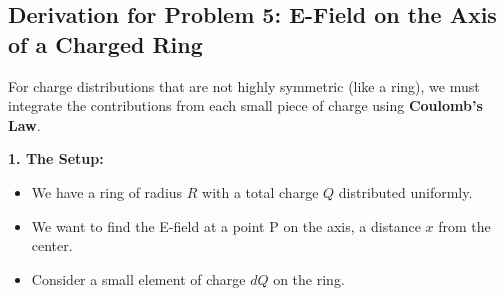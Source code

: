 \documentclass{article}
\numberwithin{equation}{section}
\begin{document}
\subsection{Derivation for Problem 5: E-Field on the Axis of a Charged Ring}
For charge distributions that are not highly symmetric (like a ring), we must integrate the contributions from each small piece of charge using \textbf{Coulomb's Law}.

\textbf{1. The Setup:}
\begin{itemize}
    \item We have a ring of radius $R$ with a total charge $Q$ distributed uniformly.
    \item We want to find the E-field at a point P on the axis, a distance $x$ from the center.
    \item Consider a small element of charge $dQ$ on the ring.
\end{itemize}
\end{document}
